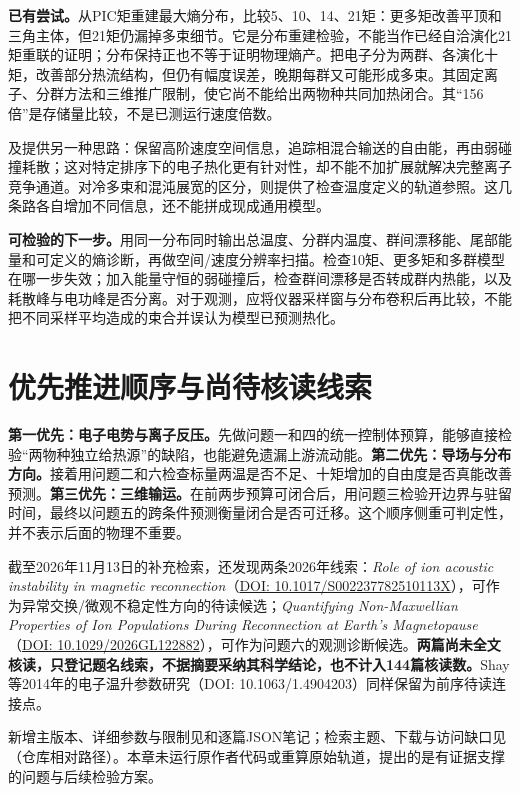\textbf{已有尝试。}\citet{E553}从PIC矩重建最大熵分布，比较5、10、14、21矩：更多矩改善平顶和三角主体，但21矩仍漏掉多束细节。它是分布重建检验，不能当作已经自洽演化21矩重联的证明；分布保持正也不等于证明物理熵产。\citet{F635}把电子分为两群、各演化十矩，改善部分热流结构，但仍有幅度误差，晚期每群又可能形成多束。其固定离子、分群方法和三维推广限制，使它尚不能给出两物种共同加热闭合。其“156倍”是存储量比较，不是已测运行速度倍数。

\citet{E512}及\citet{Loureiro2013Heating}提供另一种思路：保留高阶速度空间信息，追踪相混合输送的自由能，再由弱碰撞耗散；这对特定排序下的电子热化更有针对性，却不能不加扩展就解决完整离子竞争通道。\citet{Yoon2023PhaseSpace}对冷多束和混沌展宽的区分，则提供了检查温度定义的轨道参照。这几条路各自增加不同信息，还不能拼成现成通用模型。

\textbf{可检验的下一步。}用同一分布同时输出总温度、分群内温度、群间漂移能、尾部能量和可定义的熵诊断，再做空间/速度分辨率扫描。检查10矩、更多矩和多群模型在哪一步失效；加入能量守恒的弱碰撞后，检查群间漂移是否转成群内热能，以及耗散峰与电功峰是否分离。对于观测，应将仪器采样窗与分布卷积后再比较，不能把不同采样平均造成的束合并误认为模型已预测热化。

\section{优先推进顺序与尚待核读线索}
\textbf{第一优先：电子电势与离子反压。}先做问题一和四的统一控制体预算，能够直接检验“两物种独立给热源”的缺陷，也能避免遗漏上游流动能。\textbf{第二优先：导场与分布方向。}接着用问题二和六检查标量两温是否不足、十矩增加的自由度是否真能改善预测。\textbf{第三优先：三维输运。}在前两步预算可闭合后，用问题三检验开边界与驻留时间，最终以问题五的跨条件预测衡量闭合是否可迁移。这个顺序侧重可判定性，并不表示后面的物理不重要。

截至2026年11月13日的补充检索，还发现两条2026年线索：\emph{Role of ion acoustic instability in magnetic reconnection}（\href{https://doi.org/10.1017/S002237782510113X}{DOI: 10.1017/S002237782510113X}），可作为异常交换/微观不稳定性方向的待读候选；\emph{Quantifying Non-Maxwellian Properties of Ion Populations During Reconnection at Earth's Magnetopause}（\href{https://doi.org/10.1029/2026GL122882}{DOI: 10.1029/2026GL122882}），可作为问题六的观测诊断候选。\textbf{两篇尚未全文核读，只登记题名线索，不据摘要采纳其科学结论，也不计入144篇核读数。}Shay等2014年的电子温升参数研究（DOI: 10.1063/1.4904203）同样保留为前序待读连接点。

新增主版本、详细参数与限制见和逐篇JSON笔记；检索主题、下载与访问缺口见（仓库相对路径）。本章未运行原作者代码或重算原始轨道，提出的是有证据支撑的问题与后续检验方案。
